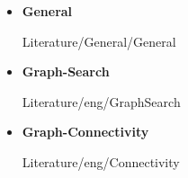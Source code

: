 \begin{itemize}
  \item
    \textbf{General}
    \begin{btSect}{Literature/General/General}
      \btPrintAll
    \end{btSect}
\end{itemize}
\newpage
\begin{itemize}
  \item
    \textbf{Graph-Search}
    \begin{btSect}{Literature/eng/GraphSearch}
      \btPrintAll
    \end{btSect}
  \item
    \textbf{Graph-Connectivity}
    \begin{btSect}{Literature/eng/Connectivity}
      \btPrintAll
    \end{btSect}
\end{itemize}